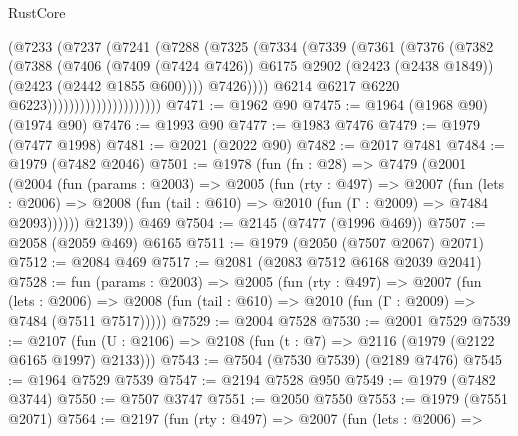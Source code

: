 \begin{lexlean}{RustCore}
\begin{coremodule}
                                  (@7233
                                    (@7237
                                      (@7241
                                        (@7288
                                          (@7325
                                            (@7334
                                              (@7339
                                                (@7361
                                                  (@7376
                                                    (@7382
                                                      (@7388
                                                        (@7406
                                                          (@7409 (@7424 @7426))
                                                          @6175
                                                          @2902
                                                          (@2423 (@2438 @1849))
                                                          (@2423 (@2442 @1855 @600))))
                                                      @7426))))
                                              @6214
                                              @6217
                                              @6220
                                              @6223)))))))))))))))))))))
@7471 := @1962 @90
@7475 := @1964 (@1968 @90) (@1974 @90)
@7476 := @1993 @90
@7477 := @1983 @7476
@7479 := @1979 (@7477 @1998)
@7481 := @2021 (@2022 @90)
@7482 := @2017 @7481
@7484 := @1979 (@7482 @2046)
@7501 := @1978
    (fun (fn : @28) =>
    @7479
      (@2001
        (@2004
          (fun (params : @2003) =>
          @2005
            (fun (rty : @497) =>
            @2007
              (fun (lets : @2006) =>
              @2008 (fun (tail : @610) => @2010 (fun (Γ : @2009) => @7484 @2093))))))
        @2139))
    @469
@7504 := @2145 (@7477 (@1996 @469))
@7507 := @2058 (@2059 @469) @6165
@7511 := @1979 (@2050 (@7507 @2067) @2071)
@7512 := @2084 @469
@7517 := @2081 (@2083 @7512 @6168 @2039 @2041)
@7528 := fun (params : @2003) =>
  @2005
    (fun (rty : @497) =>
    @2007
      (fun (lets : @2006) =>
      @2008 (fun (tail : @610) => @2010 (fun (Γ : @2009) => @7484 (@7511 @7517)))))
@7529 := @2004 @7528
@7530 := @2001 @7529
@7539 := @2107 (fun (U : @2106) => @2108 (fun (t : @7) => @2116 (@1979 (@2122 @6165 @1997) @2133)))
@7543 := @7504 (@7530 @7539) (@2189 @7476)
@7545 := @1964 @7529 @7539
@7547 := @2194 @7528 @950
@7549 := @1979 (@7482 @3744)
@7550 := @7507 @3747
@7551 := @2050 @7550
@7553 := @1979 (@7551 @2071)
@7564 := @2197
    (fun (rty : @497) =>
    @2007
      (fun (lets : @2006) =>

\end{coremodule}
\end{lexlean}
